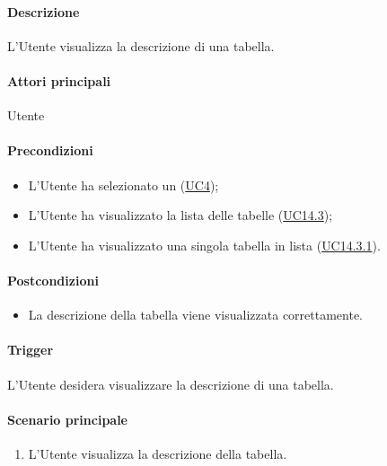 \paragraph*{Descrizione}
L'Utente visualizza la descrizione di una tabella.

\paragraph*{Attori principali}
Utente

\paragraph*{Precondizioni}
\begin{itemize}
  \item L'Utente ha selezionato un  (\hyperref[UC4]{UC4});
  \item L'Utente ha visualizzato la lista delle tabelle (\hyperref[UC14point3]{UC14.3});
  \item L'Utente ha visualizzato una singola tabella in lista (\hyperref[UC14point3point1]{UC14.3.1}).
\end{itemize}

\paragraph*{Postcondizioni}
\begin{itemize}
  \item La descrizione della tabella viene visualizzata correttamente.
\end{itemize}

\paragraph*{Trigger}
L'Utente desidera visualizzare la descrizione di una tabella.

\paragraph*{Scenario principale}
\begin{enumerate}
  \item L'Utente visualizza la descrizione della tabella.
\end{enumerate}